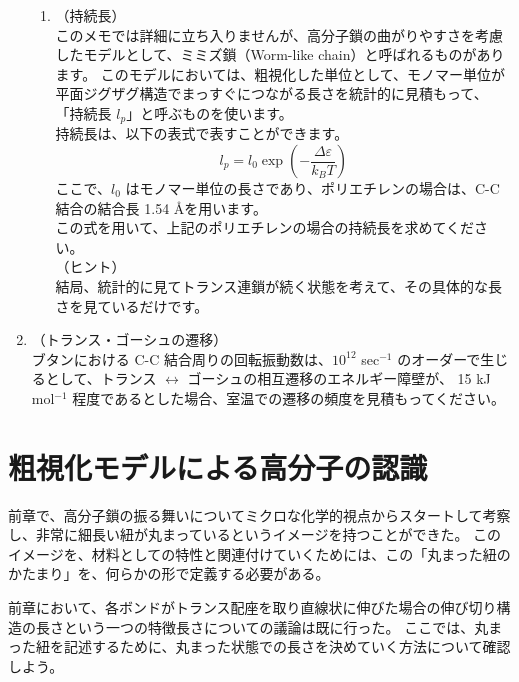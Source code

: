\documentclass[a4paper,11pt]{ltjsarticle}
\begin{document}
\begin{enumerate}
\begin{enumerate}
			\item
			\label{it:2-5}
			（持続長）\\
			このメモでは詳細に立ち入りませんが、高分子鎖の曲がりやすさを考慮したモデルとして、ミミズ鎖（Worm-like chain）と呼ばれるものがあります。
			このモデルにおいては、粗視化した単位として、モノマー単位が平面ジグザグ構造でまっすぐにつながる長さを統計的に見積もって、
			「持続長 $l_p$」と呼ぶものを使います。\\
			持続長は、以下の表式で表すことができます。
			\begin{equation*}
			l_p = l_0 \exp \left( - \dfrac{\Delta \varepsilon}{k_B T} \right)
			\end{equation*}
			ここで、$l_0$ はモノマー単位の長さであり、ポリエチレンの場合は、C-C 結合の結合長 1.54 \AA を用います。\\
			この式を用いて、上記のポリエチレンの場合の持続長を求めてください。\\
			（ヒント）\\
			結局、統計的に見てトランス連鎖が続く状態を考えて、その具体的な長さを見ているだけです。
	\end{enumerate}
	\item
	\label{it:2-6}
	（トランス・ゴーシュの遷移）\\
	ブタンにおける C-C 結合周りの回転振動数は、$10^{12}$ sec$^{-1}$ のオーダーで生じるとして、トランス $\leftrightarrow$ ゴーシュの相互遷移のエネルギー障壁が、
	15 kJ mol$^{-1}$ 程度であるとした場合、室温での遷移の頻度を見積もってください。
\end{enumerate}

\newpage

\section{粗視化モデルによる高分子の認識}
\label{sec:CG_model}

前章で、高分子鎖の振る舞いについてミクロな化学的視点からスタートして考察し、非常に細長い紐が丸まっているというイメージを持つことができた。
このイメージを、材料としての特性と関連付けていくためには、この「丸まった紐のかたまり」を、何らかの形で定義する必要がある。

前章において、各ボンドがトランス配座を取り直線状に伸びた場合の伸び切り構造の長さという一つの特徴長さについての議論は既に行った。
ここでは、丸まった紐を記述するために、丸まった状態での長さを決めていく方法について確認しよう。
\end{document}

